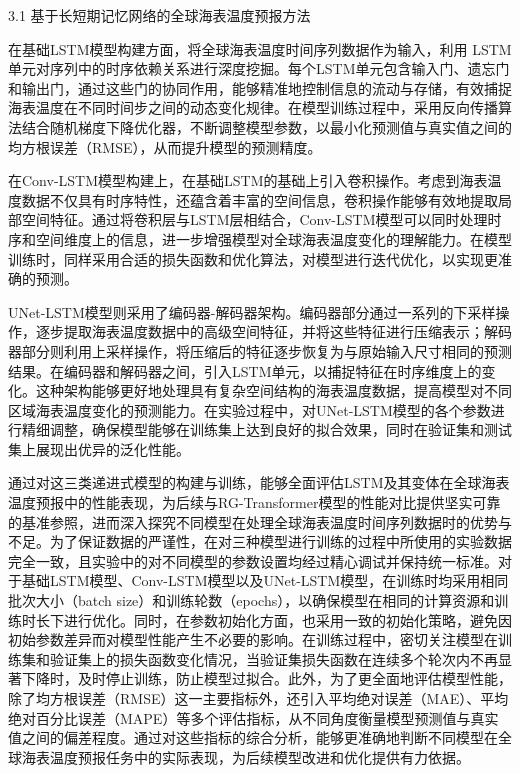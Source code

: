 \documentclass[
  12pt,
]{article}
\begin{document}
\protect{}\label{_Toc2038602343}{}3.1
基于长短期记忆网络的全球海表温度预报方法

在基础LSTM模型构建方面，将全球海表温度时间序列数据作为输入，利用
LSTM单元对序列中的时序依赖关系进行深度挖掘。每个LSTM单元包含输入门、遗忘门和输出门，通过这些门的协同作用，能够精准地控制信息的流动与存储，有效捕捉海表温度在不同时间步之间的动态变化规律。在模型训练过程中，采用反向传播算法结合随机梯度下降优化器，不断调整模型参数，以最小化预测值与真实值之间的均方根误差（RMSE），从而提升模型的预测精度。

在Conv-LSTM模型构建上，在基础LSTM的基础上引入卷积操作。考虑到海表温度数据不仅具有时序特性，还蕴含着丰富的空间信息，卷积操作能够有效地提取局部空间特征。通过将卷积层与LSTM层相结合，Conv-LSTM模型可以同时处理时序和空间维度上的信息，进一步增强模型对全球海表温度变化的理解能力。在模型训练时，同样采用合适的损失函数和优化算法，对模型进行迭代优化，以实现更准确的预测。

UNet-LSTM模型则采用了编码器-解码器架构。编码器部分通过一系列的下采样操作，逐步提取海表温度数据中的高级空间特征，并将这些特征进行压缩表示；解码器部分则利用上采样操作，将压缩后的特征逐步恢复为与原始输入尺寸相同的预测结果。在编码器和解码器之间，引入LSTM单元，以捕捉特征在时序维度上的变化。这种架构能够更好地处理具有复杂空间结构的海表温度数据，提高模型对不同区域海表温度变化的预测能力。在实验过程中，对UNet-LSTM模型的各个参数进行精细调整，确保模型能够在训练集上达到良好的拟合效果，同时在验证集和测试集上展现出优异的泛化性能。

通过对这三类递进式模型的构建与训练，能够全面评估LSTM及其变体在全球海表温度预报中的性能表现，为后续与RG-Transformer模型的性能对比提供坚实可靠的基准参照，进而深入探究不同模型在处理全球海表温度时间序列数据时的优势与不足。为了保证数据的严谨性，在对三种模型进行训练的过程中所使用的实验数据完全一致，且实验中的对不同模型的参数设置均经过精心调试并保持统一标准。对于基础LSTM模型、Conv-LSTM模型以及UNet-LSTM模型，在训练时均采用相同批次大小（batch
size）和训练轮数（epochs），以确保模型在相同的计算资源和训练时长下进行优化。同时，在参数初始化方面，也采用一致的初始化策略，避免因初始参数差异而对模型性能产生不必要的影响。在训练过程中，密切关注模型在训练集和验证集上的损失函数变化情况，当验证集损失函数在连续多个轮次内不再显著下降时，及时停止训练，防止模型过拟合。此外，为了更全面地评估模型性能，除了均方根误差（RMSE）这一主要指标外，还引入平均绝对误差（MAE）、平均绝对百分比误差（MAPE）等多个评估指标，从不同角度衡量模型预测值与真实值之间的偏差程度。通过对这些指标的综合分析，能够更准确地判断不同模型在全球海表温度预报任务中的实际表现，为后续模型改进和优化提供有力依据。
\end{document}
